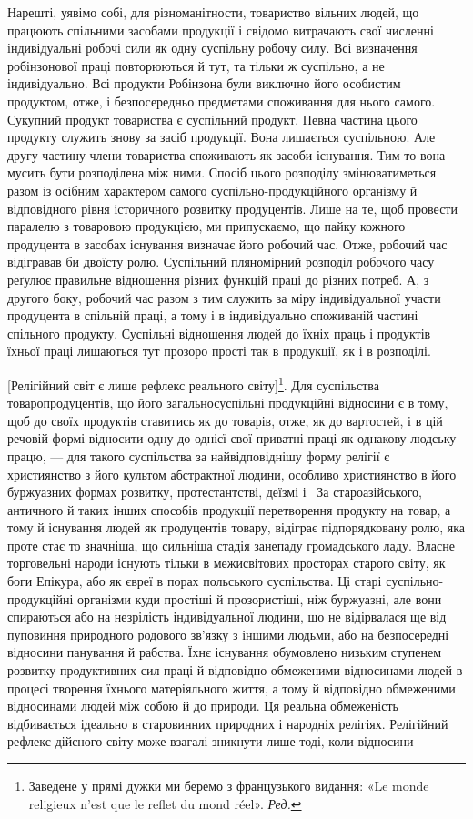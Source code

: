 Нарешті, уявімо собі, для різноманітности, товариство вільних
людей, що працюють спільними засобами продукції і свідомо
витрачають свої численні індивідуальні робочі сили як одну суспільну
робочу силу. Всі визначення робінзонової праці повторюються
й тут, та тільки ж суспільно, а не індивідуально. Всі продукти Робінзона були виключно його
особистим продуктом, отже, і безпосередньо предметами споживання для нього самого. Сукупний продукт
товариства є суспільний продукт. Певна частина
цього продукту служить знову за засіб продукції. Вона лишається суспільною. Але другу частину члени
товариства споживають як засоби існування. Тим то вона мусить бути розподілена між ними. Спосіб
цього розподілу змінюватиметься разом із осібним характером самого суспільно-продукційного організму
й відповідного рівня історичного розвитку продуцентів. Лише на те, щоб провести паралелю з товаровою
продукцією, ми припускаємо, що пайку кожного продуцента в засобах існування визначає його робочий
час. Отже, робочий час відігравав би двоїсту ролю. Суспільний пляномірний розподіл робочого часу
реґулює правильне відношення різних функцій праці до різних потреб. А, з другого боку, робочий час
разом з тим служить за міру індивідуальної участи продуцента в спільній праці, а тому і в
індивідуально споживаній частині спільного продукту. Суспільні відношення людей до їхніх праць і
продуктів їхньої праці лишаються тут прозоро прості так в продукції, як і в розподілі.

\disablefootnotebreak{}
[Релігійний світ є лише рефлекс реального світу]\footnote*{
Заведене у прямі дужки ми беремо з французького видання: «Le monde religieux n’est que le reflet
du mond réel». \emph{Ред.}
}. Для суспільства товаропродуцентів, що його
загальносуспільні продукційні відносини є в тому, щоб до своїх продуктів ставитись як до товарів,
отже, як до вартостей, і в цій речовій формі відносити одну до однієї свої приватні праці як
однакову людську працю, — для такого суспільства за найвідповіднішу форму релігії є християнство з
його культом абстрактної людини, особливо християнство в його буржуазних формах розвитку,
протестантстві, деїзмі і~ За староазійського, античного й таких інших способів продукції
перетворення продукту на товар, а тому й існування людей як продуцентів товару, відіграє
підпорядковану ролю, яка проте стає то значніша, що сильніша стадія занепаду громадського ладу.
Власне торговельні народи існують тільки в межисвітових просторах старого світу, як боги Епікура,
або як євреї в порах польського суспільства. Ці старі суспільно-продукційні організми куди простіші
й прозористіші, ніж буржуазні, але вони спираються або на незрілість індивідуальної людини, що не
відірвалася ще від пуповиння природного родового зв’язку з іншими людьми, або на безпосередні
відносини панування й рабства. Їхнє існування обумовлено низьким ступенем розвитку продуктивних сил
праці й відповідно обмеженими відносинами людей в процесі творення їхнього матеріяльного життя, а
тому й відповідно обмеженими відносинами людей між собою й до природи. Ця реальна обмеженість
відбивається ідеально в старовинних природних і народніх релігіях. Релігійний рефлекс дійсного світу
може взагалі зникнути лише тоді, коли відносини
\parbreak{}  %
